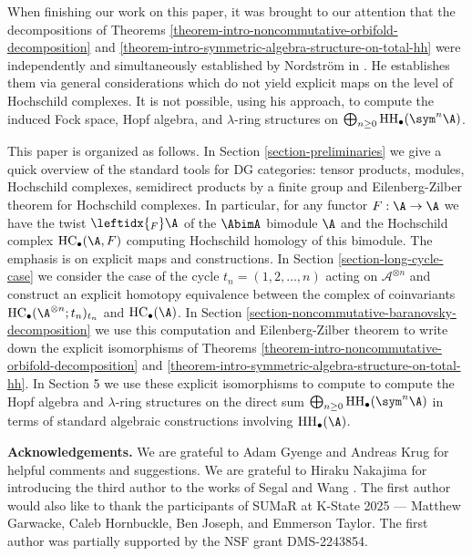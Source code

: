 \documentclass[12pt,a4paper,reqno]{amsart}
\DeclareMathOperator{\hochhom}{{HH}}
\DeclareMathOperator{\hochcx}{{HC}}
\begin{document}
When finishing our work on this paper, it was brought to our attention 
that the decompositions of Theorems 
\ref{theorem-intro-noncommutative-orbifold-decomposition} and
\ref{theorem-intro-symmetric-algebra-structure-on-total-hh}
were independently and simultaneously established by Nordstr\"om 
in \cite{Nordstrom-HochschildHomologyOfSymmetricPowersOfDGcategories}. 
He establishes them via general considerations which do 
not yield explicit maps on the level of Hochschild complexes. 
It is not possible, using his approach, to compute the induced 
Fock space, Hopf algebra, and $\lambda$-ring structures on
$\bigoplus_{n \geq 0} \hochhom_\bullet(\sym^n \A)$. 


This paper is organized as follows. In Section \ref{section-preliminaries}
we give a quick overview of
the standard tools for DG categories: tensor products, modules, Hochschild 
complexes, semidirect products by a finite group and Eilenberg-Zilber theorem
for Hochschild complexes. In particular, for any functor $F: \A \to \A$ 
we have the twist $\leftidx{_F} \A$ of the $\AbimA$ bimodule $\A$ and
the Hochschild complex $\hochcx_\bullet(\A, F)$ computing Hochschild
homology of this bimodule. 
The emphasis is on explicit maps and constructions. 
In Section \ref{section-long-cycle-case} we consider the case of 
the cycle $t_n = (1, 2, \ldots, n)$ acting on $\mathcal{A}^{\otimes n}$ 
and construct an explicit homotopy equivalence between the 
complex of coinvariants $\hochcx_\bullet(\A^{\otimes n};t_n)_{t_n}$ and $\hochcx_\bullet(\A)$. In Section \ref{section-noncommutative-baranovsky-decomposition} we use this computation and Eilenberg-Zilber
theorem to write down the explicit isomorphisms of Theorems 
\ref{theorem-intro-noncommutative-orbifold-decomposition} and
\ref{theorem-intro-symmetric-algebra-structure-on-total-hh}. 
In Section 5 we use these explicit isomorphisms to compute
to compute the Hopf algebra and $\lambda$-ring structures on the 
direct sum $\bigoplus_{n \geq 0} \hochhom_\bullet(\sym^n \A)$ in terms of 
standard algebraic constructions involving $\hochhom_\bullet(\A)$.  

\bigskip

\noindent
\textbf{Acknowledgements.} 
We are grateful to Adam Gyenge and Andreas Krug for helpful comments
and suggestions. We are grateful to Hiraku Nakajima for introducing
the third author to the works of Segal
\cite{Segal-EquivariantKTheoryAndSymmetricProducts} and Wang
\cite{Wang-EquivariantKTheoryWreathProductsAndHeisenbergAlgebra}. 
The first author would also like to thank the participants of SUMaR at 
K-State 2025 --- Matthew Garwacke, Caleb Hornbuckle, Ben Joseph, and 
Emmerson Taylor. 
The first author was partially supported by the NSF grant DMS-2243854.
\end{document}
